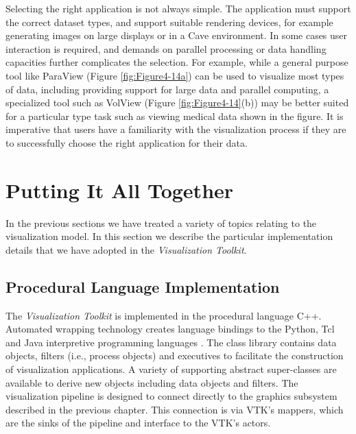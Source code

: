 Selecting the right application is not always simple. The application must support the correct dataset types, and support suitable rendering devices, for example generating images on large displays \cite{Humphreys99} or in a Cave \cite{CruzNeira93} environment. In some cases user interaction is required, and demands on parallel processing or data handling capacities further complicates the selection. For example, while a general purpose tool like ParaView (Figure \ref{fig:Figure4-14a}) can be used to visualize most types of data, including providing support for large data and parallel computing, a specialized tool such as VolView (Figure \ref{fig:Figure4-14}(b)) may be better suited for a particular type task such as viewing medical data shown in the figure. It is imperative that users have a familiarity with the visualization process if they are to successfully choose the right application for their data.

\section{Putting It All Together}
\label{sec:chap04.putting_it_all_together}

In the previous sections we have treated a variety of topics relating to the visualization model. In this section we describe the particular implementation details that we have adopted in the \emph{Visualization Toolkit}.

\subsection{Procedural Language Implementation}
\label{subsec:procedural_language_implementation}

The \emph{Visualization Toolkit} is implemented in the procedural language C++. Automated wrapping technology creates language bindings to the Python, Tcl and Java interpretive programming languages \cite{King03}. The class library contains data objects, filters (i.e., process objects) and executives to facilitate the construction of visualization applications. A variety of supporting abstract super-classes are available to derive new objects including data objects and filters. The visualization pipeline is designed to connect directly to the graphics subsystem described in the previous chapter. This connection is via VTK's mappers, which are the sinks of the pipeline and interface to the VTK's actors.

